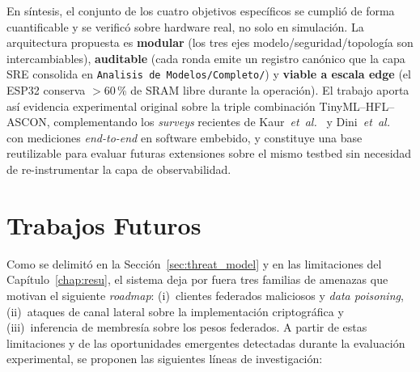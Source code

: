 En síntesis, el conjunto de los cuatro objetivos específicos se cumplió de forma cuantificable y se verificó sobre hardware real, no solo en simulación. La arquitectura propuesta es \textbf{modular} (los tres ejes modelo/seguridad/topología son intercambiables), \textbf{auditable} (cada ronda emite un registro canónico que la capa SRE consolida en \texttt{Analisis de Modelos/Completo/}) y \textbf{viable a escala edge} (el ESP32 conserva $>$60\,\% de SRAM libre durante la operación). El trabajo aporta así evidencia experimental original sobre la triple combinación TinyML--HFL--ASCON, complementando los \emph{surveys} recientes de Kaur~\textit{et~al.}~\cite{Kaur2025_ASCON_Survey} y Dini~\textit{et~al.}~\cite{Dini2024_EmbeddedIIoT_Review} con mediciones \emph{end-to-end} en software embebido, y constituye una base reutilizable para evaluar futuras extensiones sobre el mismo testbed sin necesidad de re-instrumentar la capa de observabilidad.

\section{Trabajos Futuros}
\label{sec:future}

Como se delimitó en la Sección~\ref{sec:threat_model} y en las limitaciones del Capítulo~\ref{chap:resu}, el sistema deja por fuera tres familias de amenazas que motivan el siguiente \emph{roadmap}: (i)~clientes federados maliciosos y \emph{data poisoning}, (ii)~ataques de canal lateral sobre la implementación criptográfica y (iii)~inferencia de membresía sobre los pesos federados. A partir de estas limitaciones y de las oportunidades emergentes detectadas durante la evaluación experimental, se proponen las siguientes líneas de investigación:

